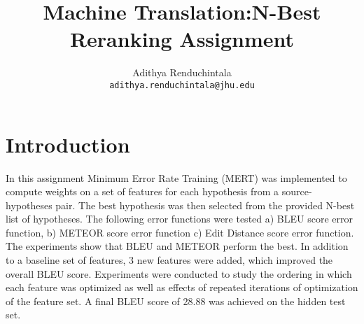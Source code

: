\documentclass[11pt]{article}
\title{Machine Translation:N-Best Reranking Assignment}
\author{Adithya Renduchintala \\
  {\tt adithya.renduchintala@jhu.edu}\\
  }
\date{}
\begin{document}
\maketitle


\section{Introduction}
 In this assignment Minimum Error Rate Training (MERT) was implemented to
 compute weights on a set of features for each hypothesis from a
 source-hypotheses pair.
 The best hypothesis was then selected from the provided N-best list of
 hypotheses.
 The following error functions were tested a) BLEU score error function, b)
 METEOR score error function c) Edit Distance score error function. The
 experiments show that BLEU and METEOR perform the best. In addition to a baseline set of features, 3 new features were added, which improved the overall BLEU score. Experiments were
 conducted to study the ordering in which each feature was optimized as well as
 effects of repeated iterations of optimization of the feature set. A final BLEU
 score of 28.88 was achieved  on the hidden test set.
\end{document}
